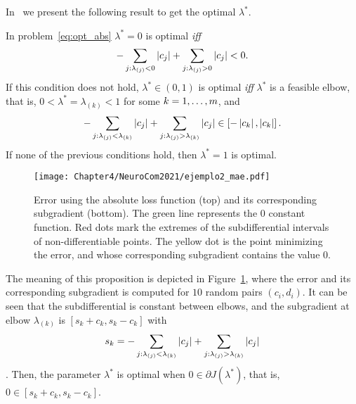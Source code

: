 In~\citet[Proposition 2]{RuizAD21} we present the following result to get the optimal $\lambda^*$.
\begin{prop}\label{prop:abs_neurocom2020}
    In problem~\eqref{eq:opt_abs} $\lambda^*=0$ is optimal \emph{iff}
    \begin{equation}\nonumber
        - \sum_{j: \lambda_{(j)} < 0} \left|c_{j}\right| + \sum_{j: \lambda_{(j)} > 0} \left|c_{j}\right| < 0.
        \end{equation}
    If this condition does not hold, $\lambda^* \in (0,1)$ is optimal \emph{iff} $\lambda^*$ is a feasible elbow, that is, $0 < \lambda^* = \lambda_{(k)} < 1$ for some $k=1, \dotsc, m$, and
    \begin{equation}\label{sol_abs_e}
    - \sum_{j: \lambda_{(j)} < \lambda_{(k)}} \abs{c_{j}} + \sum_{j: \lambda_{(j)} > \lambda_{(k)}} \abs{c_{j}} \in \left[ -  \abs{c_{k}},  \abs{c_{k}}  \right] .
    \end{equation}
    If none of the previous conditions hold, then $\lambda^*=1$ is optimal.
\end{prop}
\begin{figure}[t!]
    \centering
    \texttt{[image: Chapter4/NeuroCom2021/ejemplo2\_mae.pdf]}
    \caption{Error using the absolute loss function (top) and its corresponding subgradient (bottom). The green line represents the $0$ constant function. Red dots mark the extremes of the subdifferential intervals of non-differentiable points. The yellow dot is the point minimizing the error, and whose corresponding subgradient contains the value $0$.}
    \label{fig:abs_error}
\end{figure}
The meaning of this proposition is depicted in Figure~\ref{fig:abs_error}, where the error and its corresponding subgradient is computed for $10$ random pairs $(c_i, d_i)$. It can be seen that the subdifferential is constant between elbows, and the subgradient at elbow $\lambda_{(k)}$ is $[s_k + c_k, s_k - c_k]$ with
$$ s_k = - \sum_{j: \lambda_{(j)} < \lambda_{(k)}} \left|c_{j}\right| + \sum_{j: \lambda_{(j)} > \lambda_{(k)}} \left|c_{j}\right| $$. Then, the parameter $\lambda^*$ is optimal when $0 \in \partial J(\lambda^*)$, that is, $0 \in [s_k + c_k, s_k - c_k]$.


